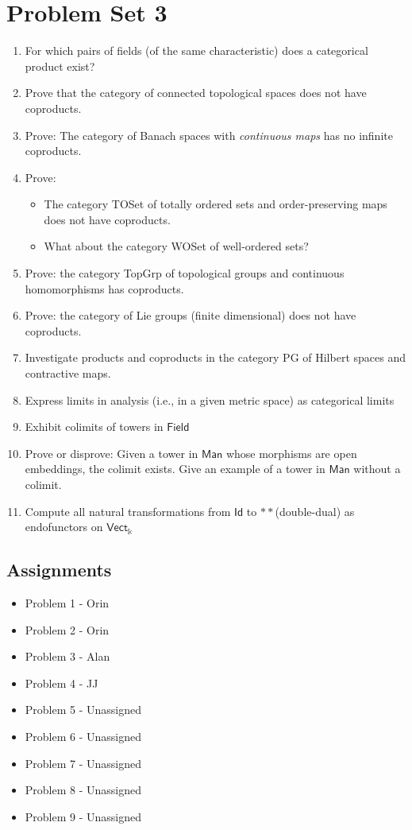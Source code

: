 \documentclass{article}
\begin{document}
\section{Problem Set 3}
\begin{enumerate}
	\item For which pairs of fields (of the same characteristic) does a categorical product exist?
	\item Prove that the category of connected topological spaces does not have coproducts.
	\item Prove: The category of Banach spaces with \textit{continuous maps} has no infinite coproducts.
	\item Prove:
	\begin{itemize}
		\item The category \textsf{TOSet} of totally ordered sets and order-preserving maps does not have coproducts.
		\item What about the category \textsf{WOSet} of well-ordered sets? 
	\end{itemize}
\item Prove: the category \textsf{TopGrp} of topological groups and continuous homomorphisms has coproducts.
\item Prove: the category of Lie groups (finite dimensional) does not have coproducts.
\item Investigate products and coproducts in the category \textsf{PG} of Hilbert spaces and contractive maps.
\item Express limits in analysis (i.e., in a given metric space) as categorical limits
\item Exhibit colimits of towers in $\textsf{Field}$
\item Prove or disprove: Given a tower in $\textsf{Man}$ whose morphisms are open embeddings, the colimit exists.  Give an example of a tower in $\textsf{Man}$ without a colimit.
\item Compute all natural transformations from $\textsf{Id}$ to $**$(double-dual) as endofunctors on $\textsf{Vect}_{\mathbb{k}}$ 	
\end{enumerate}
\subsection*{Assignments}
\begin{itemize}
	\item Problem 1 - Orin
	\item Problem 2 - Orin
	\item Problem 3 - Alan
	\item Problem 4 - JJ
	\item Problem 5 - Unassigned
	\item Problem 6 - Unassigned
	\item Problem 7 - Unassigned
	\item Problem 8 - Unassigned
	\item Problem 9 - Unassigned
\end{itemize}
\end{document}
